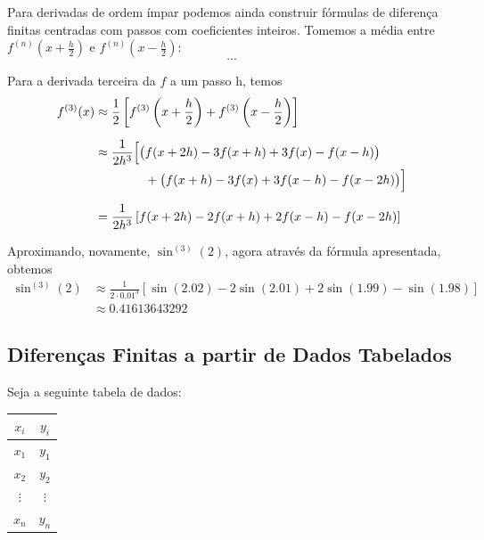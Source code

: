 \documentclass[12pt,openany]{book}
\begin{document}
Para derivadas de ordem ímpar podemos ainda construir fórmulas de diferença finitas centradas com passos com coeficientes inteiros.
Tomemos a média entre $f^{(n)}\left(x + \frac{h}{2}\right)$ e $f^{(n)}\left(x - \frac{h}{2}{}\right)$:
\[
    ...
\]

\begin{example}{}{}
    Para a derivada terceira da $f$ a um passo h, temos
    \[
        \begin{aligned}
        f^{(3)}(x)
        &\approx \frac{1}{2}\left[
            f^{(3)}\left(x + \frac{h}{2}\right)
            + f^{(3)}\left(x - \frac{h}{2}\right)
        \right]
        \\[6pt]
        &\approx \frac{1}{2h^{3}}
        \Bigl[
            \bigl(
                f(x + 2h)
                - 3f(x + h)
                + 3f(x)
                - f(x - h)
            \bigr)
        \\
        &\qquad\qquad
            +
            \bigl(
                f(x + h)
                - 3f(x)
                + 3f(x - h)
                - f(x - 2h)
            \bigr)
        \Bigr]
        \\[6pt]
        &= \frac{1}{2h^{3}}
        \left[
            f(x + 2h)
            - 2f(x + h)
            + 2f(x - h)
            - f(x - 2h)
        \right]
        \end{aligned}
    \]

    Aproximando, novamente, $\sin^{(3)}(2)$, agora através da fórmula apresentada, obtemos
    \[
        \begin{aligned}
            \sin^{(3)}(2) &\approx \frac{1}{2 \cdot 0.01^3} \left[ \sin(2.02) - 2\sin(2.01) + 2\sin(1.99) - \sin(1.98) \right] \\
            &\approx 0.41613643292
        \end{aligned}
    \]
\end{example}

\subsection{Diferenças Finitas a partir de Dados Tabelados}
Seja a seguinte tabela de dados:

\begin{table}[h]
    \centering
    \begin{tabular}{cc}
        \toprule
        $x_i$ & $y_i$ \\
        \midrule
        $x_1$ & $y_1$ \\
        $x_2$ & $y_2$ \\
        $\vdots$ & $\vdots$ \\
        $x_n$ & $y_n$ \\
        \bottomrule
    \end{tabular}
\end{table}
\end{document}
